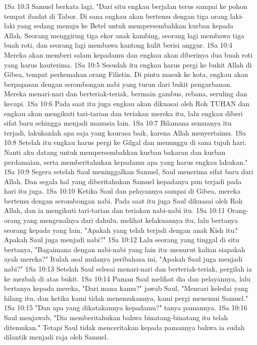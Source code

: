 1Sa 10:3  Samuel berkata lagi, "Dari situ engkau berjalan terus sampai ke pohon tempat ibadat di Tabor. Di sana engkau akan bertemu dengan tiga orang laki-laki yang sedang menuju ke Betel untuk mempersembahkan kurban kepada Allah. Seorang menggiring tiga ekor anak kambing, seorang lagi membawa tiga buah roti, dan seorang lagi membawa kantong kulit berisi anggur.
1Sa 10:4  Mereka akan memberi salam kepadamu dan engkau akan diberinya dua buah roti yang harus kauterima.
1Sa 10:5  Sesudah itu engkau harus pergi ke bukit Allah di Gibea, tempat perkemahan orang Filistin. Di pintu masuk ke kota, engkau akan berpapasan dengan serombongan nabi yang turun dari bukit pengurbanan. Mereka menari-nari dan berteriak-teriak, bermain gambus, rebana, seruling dan kecapi.
1Sa 10:6  Pada saat itu juga engkau akan dikuasai oleh Roh TUHAN dan engkau akan mengikuti tari-tarian dan teriakan mereka itu, lalu engkau diberi sifat baru sehingga menjadi manusia lain.
1Sa 10:7  Bilamana semuanya itu terjadi, lakukanlah apa saja yang kaurasa baik, karena Allah menyertaimu.
1Sa 10:8  Setelah itu engkau harus pergi ke Gilgal dan menunggu di sana tujuh hari. Nanti aku datang untuk mempersembahkan kurban bakaran dan kurban perdamaian, serta memberitahukan kepadamu apa yang harus engkau lakukan."
1Sa 10:9  Segera setelah Saul meninggalkan Samuel, Saul menerima sifat baru dari Allah. Dan segala hal yang diberitahukan Samuel kepadanya pun terjadi pada hari itu juga.
1Sa 10:10  Ketika Saul dan pelayannya sampai di Gibea, mereka bertemu dengan serombongan nabi. Pada saat itu juga Saul dikuasai oleh Roh Allah, dan ia mengikuti tari-tarian dan teriakan nabi-nabi itu.
1Sa 10:11  Orang-orang yang mengenalnya dari dahulu, melihat kelakuannya itu, lalu bertanya seorang kepada yang lain, "Apakah yang telah terjadi dengan anak Kish itu? Apakah Saul juga menjadi nabi?"
1Sa 10:12  Lalu seorang yang tinggal di situ bertanya, "Bagaimana dengan nabi-nabi yang lain itu--menurut kalian siapakah ayah mereka?" Itulah asal mulanya peribahasa ini, "Apakah Saul juga menjadi nabi?"
1Sa 10:13  Setelah Saul selesai menari-nari dan berteriak-teriak, pergilah ia ke mezbah di atas bukit.
1Sa 10:14  Paman Saul melihat dia dan pelayannya, lalu bertanya kepada mereka, "Dari mana kamu?" jawab Saul, "Mencari keledai yang hilang itu, dan ketika kami tidak menemukannya, kami pergi menemui Samuel."
1Sa 10:15  "Dan apa yang dikatakannya kepadamu?" tanya pamannya.
1Sa 10:16  Saul menjawab, "Dia memberitahukan bahwa binatang-binatang itu telah ditemukan." Tetapi Saul tidak menceritakan kepada pamannya bahwa ia sudah dilantik menjadi raja oleh Samuel.
